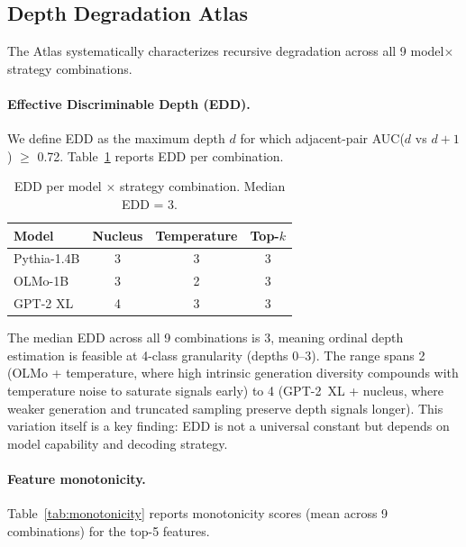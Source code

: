 \documentclass[11pt,a4paper]{article}
\begin{document}
\subsection{Depth Degradation Atlas}
\label{sec:atlas}

The Atlas systematically characterizes recursive degradation across all 9 model$\times$strategy combinations.

\paragraph{Effective Discriminable Depth (EDD).}
We define EDD as the maximum depth $d$ for which adjacent-pair AUC($d$ vs $d{+}1$) $\geq$ 0.72.
Table~\ref{tab:edd} reports EDD per combination.

\begin{table}[t]
\centering
\small
\caption{EDD per model $\times$ strategy combination. Median EDD = 3.}
\label{tab:edd}
\begin{tabular}{@{}lccc@{}}
\toprule
\textbf{Model} & \textbf{Nucleus} & \textbf{Temperature} & \textbf{Top-$k$} \\
\midrule
Pythia-1.4B & 3 & 3 & 3 \\
OLMo-1B & 3 & 2 & 3 \\
GPT-2 XL & 4 & 3 & 3 \\
\bottomrule
\end{tabular}
\end{table}

The median EDD across all 9 combinations is 3, meaning ordinal depth estimation is feasible at 4-class granularity (depths 0--3).
The range spans 2 (OLMo + temperature, where high intrinsic generation diversity compounds with temperature noise to saturate signals early) to 4 (GPT-2~XL + nucleus, where weaker generation and truncated sampling preserve depth signals longer).
This variation itself is a key finding: EDD is not a universal constant but depends on model capability and decoding strategy.

\paragraph{Feature monotonicity.}
Table~\ref{tab:monotonicity} reports monotonicity scores (mean across 9 combinations) for the top-5 features.
\end{document}
